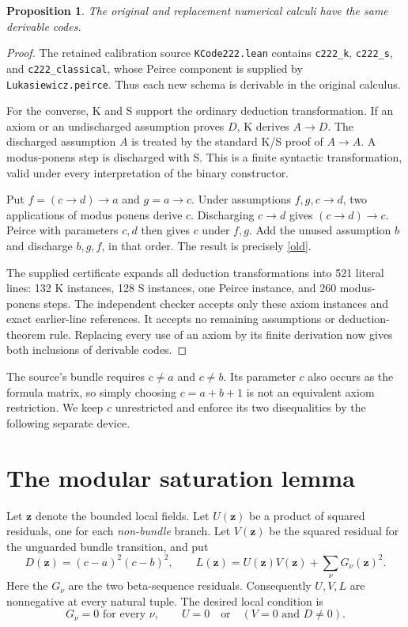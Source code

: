 \documentclass[11pt]{article}
\newtheorem{proposition}[theorem]{Proposition}
\newcommand{\imp}{\mathbin{\to}}
\newcommand{\file}[1]{\texttt{\nolinkurl{#1}}}
\begin{document}
\begin{proposition}\label{basis}
The original and replacement numerical calculi have the same derivable codes.
\end{proposition}
\begin{proof}
The retained calibration source \file{KCode222.lean} contains
\file{c222_k}, \file{c222_s}, and
\file{c222_classical}, whose Peirce component is supplied by
\file{Lukasiewicz.peirce}. Thus each new schema is derivable in the
original calculus.

For the converse, K and S support the ordinary deduction transformation.
If an axiom or an undischarged assumption proves $D$, K derives
$A\imp D$. The discharged assumption $A$ is treated by the standard K/S
proof of $A\imp A$. A modus-ponens step is discharged with S. This is a
finite syntactic transformation, valid under every interpretation of the
binary constructor.

Put $f=(c\imp d)\imp a$ and $g=a\imp c$. Under assumptions $f,g,c\imp d$,
two applications of modus ponens derive $c$. Discharging $c\imp d$ gives
$(c\imp d)\imp c$. Peirce with parameters $c,d$ then gives $c$ under $f,g$.
Add the unused assumption $b$ and discharge $b,g,f$, in that order. The result
is precisely \eqref{old}.

The supplied certificate expands all deduction transformations into 521
literal lines: 132 K instances, 128 S instances, one Peirce instance,
and 260 modus-ponens steps. The independent checker accepts only these axiom
instances and exact earlier-line references. It accepts no remaining
assumptions or deduction-theorem rule. Replacing every use of an axiom by
its finite derivation now gives both inclusions of derivable codes.
\end{proof}

The source's bundle requires $c\ne a$ and $c\ne b$. Its parameter $c$ also
occurs as the formula matrix, so simply choosing $c=a+b+1$ is not an
equivalent axiom restriction. We keep $c$ unrestricted and enforce its two
disequalities by the following separate device.

\section{The modular saturation lemma}

Let $\boldsymbol z$ denote the bounded local fields. Let $U(\boldsymbol z)$
be a product of squared residuals, one for each \emph{non-bundle} branch.
Let $V(\boldsymbol z)$ be the squared residual for the unguarded bundle
transition, and put
\[
 D(\boldsymbol z)=(c-a)^2(c-b)^2,\qquad
 L(\boldsymbol z)=U(\boldsymbol z)V(\boldsymbol z)
                  +\sum_\nu G_\nu(\boldsymbol z)^2.
\]
Here the $G_\nu$ are the two beta-sequence residuals. Consequently $U,V,L$
are nonnegative at every natural tuple. The desired local condition is
\begin{equation}\label{desired}
 G_\nu=0\text{ for every }\nu,\qquad
 U=0\quad\text{or}\quad(V=0\text{ and }D\ne0).
\end{equation}
\end{document}
